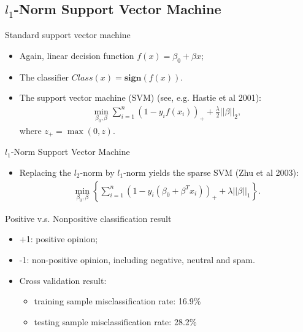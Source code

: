 \documentclass[12pt, trans]{beamer}
\newcommand{\1}[1]{{\mathbf 1}\left\{#1\right\}}        %
\begin{document}
\subsection{$l_1$-Norm Support Vector Machine}
\begin{frame}[fragile]{Standard support vector machine}

\begin{itemize}[<+->]
\item Again, linear decision function $f(x) = \beta_0 + \beta x$;
\item The classifier $Class(x) = \textbf{sign} (f(x))$. 
\item  The support vector machine (SVM) (see, e.g. Hastie et al 2001): 
\begin{align*}
\min_{\beta_0,\beta} \sum_{i=1}^n(1-y_if(x_i))_+ + \frac{\lambda}{2} ||\beta||_2,
\end{align*}
where $z_+ = \max(0,z)$. 
\end{itemize}

\end{frame}


\begin{frame}[fragile]{$l_1$-Norm Support Vector Machine}

\begin{itemize}[<+->]  
\item Replacing the $l_2$-norm by $l_1$-norm yields the sparse SVM (Zhu et al 2003):
\begin{align*}
\min_{\beta_0,\beta} \left\{ \sum_{i=1}^n(1-y_i(\beta_0+\beta^Tx_i))_+ + \lambda ||\beta||_1\right\}. 
\end{align*}
\end{itemize}

\end{frame}


\begin{frame}{Positive v.s. Nonpositive classification result}

\begin{itemize}[<+->]
\item +1: positive opinion;
\item -1: non-positive opinion, including negative, neutral and spam.
\item Cross validation result: 
  \begin{itemize}[<+->]
  \item training sample misclassification rate: 16.9\%
  \item testing sample misclassification rate: 28.2\%
  \end{itemize}

\end{itemize}



\end{frame}
\end{document}

